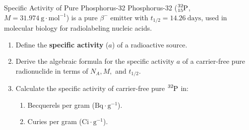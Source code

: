 \begin{exercise}{Specific Activity of Pure Phosphorus-32}
Phosphorus-32 ($\ce{^{32}_{15}P}$, $M = 31.974\ \mathrm{g\cdot mol^{-1}}$) is a pure $\beta^-$ emitter with $t_{1/2} = 14.26\ \mathrm{days}$, used in molecular biology for radiolabeling nucleic acids.
\begin{enumerate}[leftmargin=1.5em,itemsep=2pt]
  \item Define the \textbf{specific activity} ($a$) of a radioactive source.
  \item Derive the algebraic formula for the specific activity $a$ of a carrier-free pure radionuclide in terms of $N_A, M,$ and $t_{1/2}$.
  \item Calculate the specific activity of carrier-free pure $\ce{^{32}P}$ in:
  \begin{enumerate}[leftmargin=1.2em,itemsep=1pt]
    \item Becquerels per gram ($\mathrm{Bq\cdot g^{-1}}$).
    \item Curies per gram ($\mathrm{Ci\cdot g^{-1}}$).
  \end{enumerate}
\end{enumerate}
\end{exercise}

\begin{tabletworkspace}[5.0cm]
\end{tabletworkspace}

